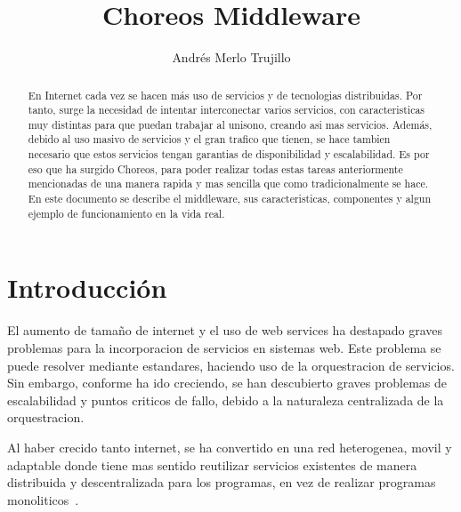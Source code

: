 \documentclass[runningheads]{llncs}
\begin{document}
%
\title{Choreos Middleware}
%
%
\author{Andrés Merlo Trujillo}
%
%
%
\maketitle              %
%
\begin{abstract}
En Internet cada vez se hacen más uso de servicios y de tecnologias distribuidas. Por tanto, surge la necesidad de intentar interconectar varios servicios, con caracteristicas muy distintas para que puedan trabajar al unisono, creando asi mas servicios. Además, debido al uso masivo de servicios y el gran trafico que tienen, se hace tambien necesario que estos servicios tengan garantias de disponibilidad y escalabilidad. Es por eso que ha surgido Choreos, para poder realizar todas estas tareas anteriormente mencionadas de una manera rapida y mas sencilla que como tradicionalmente se hace. En este documento se describe el middleware, sus caracteristicas, componentes y algun ejemplo de funcionamiento en la vida real.

\end{abstract}
%
%
%

\section{Introducción}
El aumento de tamaño de internet y el uso de web services ha destapado graves problemas para la incorporacion de servicios en sistemas web. Este problema se puede resolver mediante estandares, haciendo uso de la orquestracion de servicios. Sin embargo, conforme ha ido creciendo, se han descubierto graves problemas de escalabilidad y puntos criticos de fallo, debido a la naturaleza centralizada de la orquestracion. ~\cite{a_1}

Al haber crecido tanto internet, se ha convertido en una red heterogenea, movil y adaptable donde tiene mas sentido reutilizar servicios existentes de manera distribuida y descentralizada para los programas, en vez de realizar programas monoliticos~\cite{a_2}.
\end{document}
